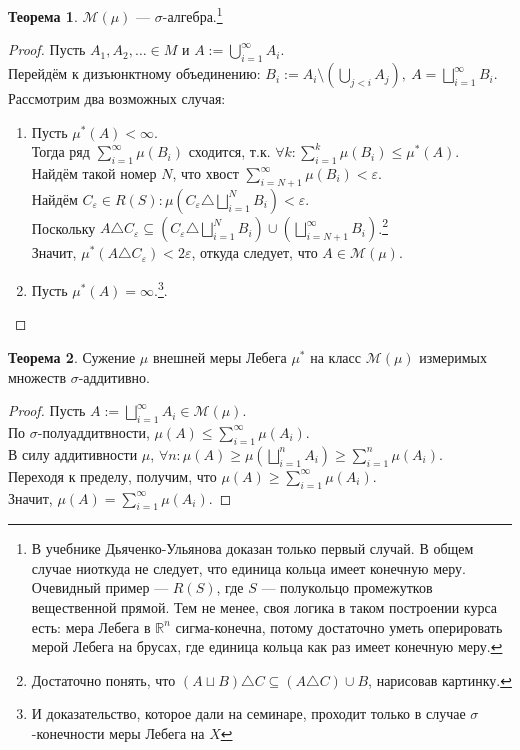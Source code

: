 \documentclass[11pt,a4paper]{report}
\def\eps{\varepsilon}
\def\Real{\mathbb{R}}
\theoremstyle{definition}
\theoremstyle{definition}
\newtheorem{theorem}{Теорема}[section]
\theoremstyle{definition}
\begin{document}
	\begin{theorem}
		$ \mathcal{M}(\mu) $ — $ \sigma $-алгебра.\footnote{В учебнике Дьяченко-Ульянова доказан только первый случай. В общем случае ниоткуда не следует, что единица кольца имеет конечную меру. Очевидный пример — $ R(S) $, где $ S $ — полукольцо промежутков вещественной прямой. Тем не менее, своя логика в таком построении курса есть: мера Лебега в $ \Real^{n} $ сигма-конечна, потому достаточно уметь оперировать мерой Лебега на брусах, где единица кольца как раз имеет конечную меру. }
	\end{theorem}
	\begin{proof}
		Пусть $ A_{1}, A_{2}, \dots \in M $  и $ A := \bigcup_{i=1}^{\infty}{A_{i}} $.\\
		Перейдём к дизъюнктному объединению: $ B_{i} := A_{i} \setminus \left (\bigcup_{j<i}{A_{j}}\right ),\ A = \bigsqcup_{i=1}^{\infty}{B_{i}} $.\\
		Рассмотрим два возможных случая:
		\begin{enumerate}
			\item Пусть $ \mu^{*}(A) < \infty $.\\ 
			Тогда ряд $ \sum_{i=1}^{\infty}{\mu(B_{i})} $ сходится, т.к. $ \forall k: \sum_{i=1}^{k}{\mu(B_{i})}  \le \mu^{*}(A) $.\\
			Найдём такой номер $ N $, что хвост $ \sum_{i=N+1}^{\infty}{\mu(B_{i})} < \eps $.\\ 
			Найдём $ C_{\eps} \in R(S): \mu\left (C_{\eps} \triangle \bigsqcup_{i=1}^{N}{B_{i}} \right ) < \eps $.\\
			Поскольку $ A \triangle C_{\eps} \subseteq \left (C_{\eps} \triangle \bigsqcup_{i=1}^{N}{B_{i}} \right ) \cup \left (\bigsqcup_{i=N+1}^{\infty}B_{i}\right ) $.\footnote{Достаточно понять, что $ (A \sqcup B) \triangle C \subseteq (A \triangle C) \cup B $, нарисовав картинку.}\\
			Значит, $ \mu^{*}(A \triangle C_{\eps}) < 2\eps $, откуда следует, что $ A \in \mathcal{M}(\mu) $.
			\item Пусть $ \mu^{*}(A) = \infty $.\footnote{И доказательство, которое дали на семинаре, проходит только в случае $ \sigma $-конечности меры Лебега на $ X $}.
		\end{enumerate}
	\end{proof}
	\begin{theorem}
		Сужение $ \mu $ внешней меры Лебега $ \mu^{*} $ на класс $ \mathcal{M}(\mu) $ измеримых множеств $ \sigma $-аддитивно.
	\end{theorem}
	\begin{proof}
		Пусть $ A := \bigsqcup_{i=1}^{\infty}{A_{i}} \in \mathcal{M}(\mu) $.\\
		По $ \sigma $-полуаддитвности, $ \mu(A) \le \sum_{i=1}^{\infty}{\mu(A_{i})} $.\\
		В силу аддитивности $ \mu $, $ \forall n: \mu(A) \ge \mu\left (\bigsqcup_{i=1}^{n}{A_{i}}\right )  \ge \sum_{i=1}^{n}{\mu(A_{i})} $.\\ 
		Переходя к пределу, получим, что $ \mu(A) \ge \sum_{i=1}^{\infty}{\mu(A_{i})} $.\\
		Значит, $ \mu(A) = \sum_{i=1}^{\infty}{\mu(A_{i})} $.
	\end{proof}
\end{document}
